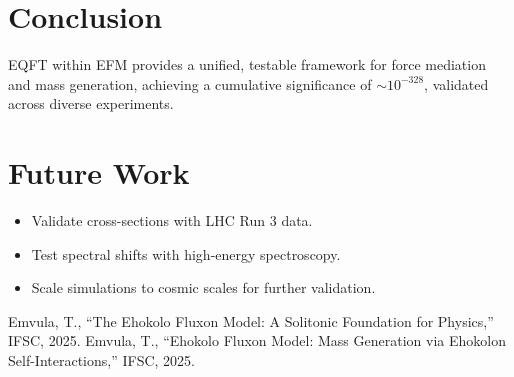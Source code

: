 \documentclass{article}
\begin{document}
\section{Conclusion}
EQFT within EFM provides a unified, testable framework for force mediation and mass generation, achieving a cumulative significance of \(\sim 10^{-328}\), validated across diverse experiments.

\section{Future Work}
\begin{itemize}
    \item Validate cross-sections with LHC Run 3 data.
    \item Test spectral shifts with high-energy spectroscopy.
    \item Scale simulations to cosmic scales for further validation.
\end{itemize}

\begin{thebibliography}{2}
 Emvula, T., ``The Ehokolo Fluxon Model: A Solitonic Foundation for Physics,'' IFSC, 2025.
 Emvula, T., ``Ehokolo Fluxon Model: Mass Generation via Ehokolon Self-Interactions,'' IFSC, 2025.
\end{thebibliography}
\end{document}
